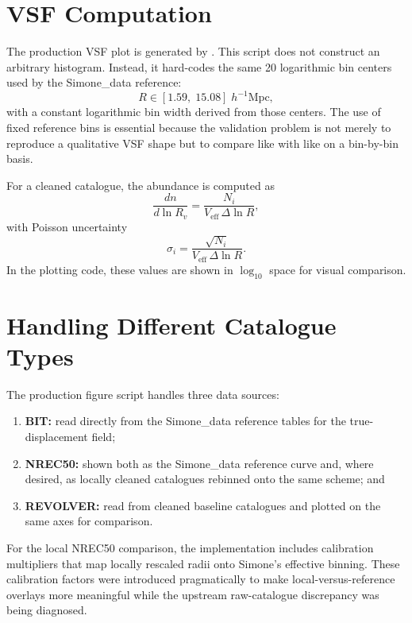 \documentclass[12pt]{report}
\begin{document}
\section{VSF Computation}

The production VSF plot is generated by . This script does not construct an arbitrary histogram. Instead, it hard-codes the same 20 logarithmic bin centers used by the Simone\_data reference:
\begin{equation}
    R \in [1.59,\;15.08]\;h^{-1}\mathrm{Mpc},
\end{equation}
with a constant logarithmic bin width derived from those centers. The use of fixed reference bins is essential because the validation problem is not merely to reproduce a qualitative VSF shape but to compare like with like on a bin-by-bin basis.

For a cleaned catalogue, the abundance is computed as
\begin{equation}
    \frac{dn}{d\ln R_v} = \frac{N_i}{V_\mathrm{eff}\,\Delta\ln R},
\end{equation}
with Poisson uncertainty
\begin{equation}
    \sigma_i = \frac{\sqrt{N_i}}{V_\mathrm{eff}\,\Delta\ln R}.
\end{equation}
In the plotting code, these values are shown in $\log_{10}$ space for visual comparison.

\section{Handling Different Catalogue Types}

The production figure script handles three data sources:
\begin{enumerate}
    \item \textbf{BIT:} read directly from the Simone\_data reference tables for the true-displacement field;
    \item \textbf{NREC50:} shown both as the Simone\_data reference curve and, where desired, as locally cleaned catalogues rebinned onto the same scheme; and
    \item \textbf{REVOLVER:} read from cleaned baseline catalogues and plotted on the same axes for comparison.
\end{enumerate}

For the local NREC50 comparison, the implementation includes calibration multipliers that map locally rescaled radii onto Simone's effective binning. These calibration factors were introduced pragmatically to make local-versus-reference overlays more meaningful while the upstream raw-catalogue discrepancy was being diagnosed.
\end{document}
